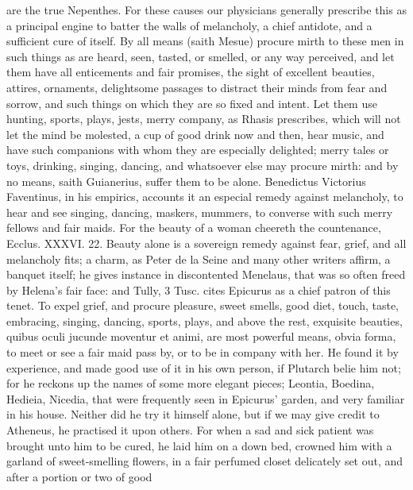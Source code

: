 {are the true Nepenthes. For these causes our physicians generally
prescribe this as a principal engine to batter the walls of melancholy,
a chief antidote, and a sufficient cure of itself. By all means (saith
 Mesue) procure mirth to these men in such things as are heard,
seen, tasted, or smelled, or any way perceived, and let them have all
enticements and fair promises, the sight of excellent beauties,
attires, ornaments, delightsome passages to distract their minds from
fear and sorrow, and such things on which they are so fixed and intent.
Let them use hunting, sports, plays, jests, merry company, as
Rhasis prescribes, which will not let the mind be molested, a cup of
good drink now and then, hear music, and have such companions with whom
they are especially delighted; merry tales or toys, drinking,
singing, dancing, and whatsoever else may procure mirth: and by no
means, saith Guianerius, suffer them to be alone. Benedictus Victorius
Faventinus, in his empirics, accounts it an especial remedy against
melancholy, to hear and see singing, dancing, maskers, mummers,
to converse with such merry fellows and fair maids. For the beauty of a
woman cheereth the countenance, Ecclus. XXXVI. 22.  Beauty alone
is a sovereign remedy against fear, grief, and all melancholy fits; a
charm, as Peter de la Seine and many other writers affirm, a banquet
itself; he gives instance in discontented Menelaus, that was so often
freed by Helena's fair face: and Tully, 3 Tusc. cites Epicurus as
a chief patron of this tenet. To expel grief, and procure pleasure,
sweet smells, good diet, touch, taste, embracing, singing, dancing,
sports, plays, and above the rest, exquisite beauties, quibus oculi
jucunde moventur et animi, are most powerful means, obvia forma, to
meet or see a fair maid pass by, or to be in company with her. He found
it by experience, and made good use of it in his own person, if
Plutarch belie him not; for he reckons up the names of some more
elegant pieces; Leontia, Boedina, Hedieia, Nicedia, that were
frequently seen in Epicurus' garden, and very familiar in his house.
Neither did he try it himself alone, but if we may give credit to
Atheneus, he practised it upon others. For when a sad and sick
patient was brought unto him to be cured, he laid him on a down bed,
crowned him with a garland of sweet-smelling flowers, in a fair
perfumed closet delicately set out, and after a portion or two of good
}
